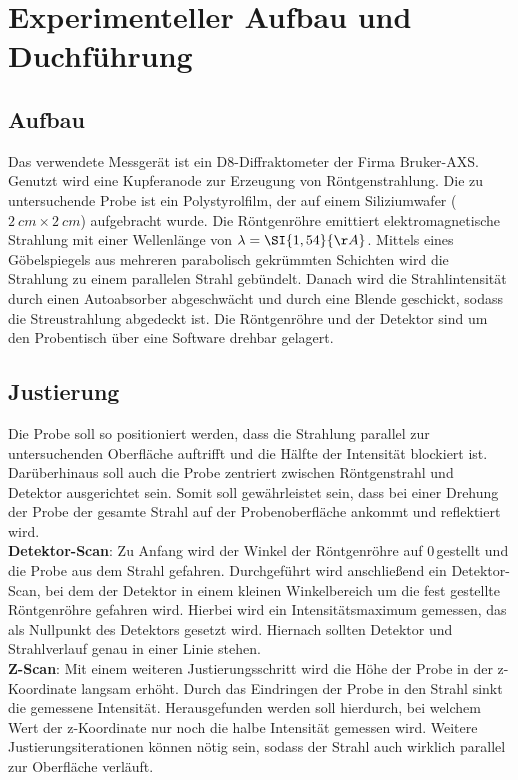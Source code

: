 \section{Experimenteller Aufbau und Duchführung}
\subsection{Aufbau}
Das verwendete Messgerät ist ein D8-Diffraktometer der Firma Bruker-AXS. Genutzt wird eine Kupferanode zur Erzeugung von Röntgenstrahlung.
Die zu untersuchende Probe ist ein Polystyrolfilm, der auf einem Siliziumwafer ($\SI{2}{cm}\times\SI{2}{cm}$) aufgebracht wurde. Die Röntgenröhre emittiert elektromagnetische Strahlung mit einer Wellenlänge von $\lambda=\SI{1,54}{\AA}$.
Mittels eines Göbelspiegels aus mehreren parabolisch gekrümmten Schichten wird die Strahlung zu einem parallelen Strahl gebündelt.
Danach wird die Strahlintensität durch einen Autoabsorber abgeschwächt und durch eine Blende geschickt, sodass die Streustrahlung abgedeckt ist. Die Röntgenröhre und der Detektor sind um den Probentisch über eine Software drehbar gelagert.
\subsection{Justierung}
Die Probe soll so positioniert werden, dass die Strahlung parallel zur untersuchenden Oberfläche auftrifft und die Hälfte der Intensität blockiert ist. Darüberhinaus soll auch die Probe zentriert zwischen Röntgenstrahl und Detektor ausgerichtet sein. Somit soll gewährleistet sein, dass bei einer Drehung der Probe der gesamte Strahl auf der Probenoberfläche ankommt und reflektiert wird.\\

\textbf{Detektor-Scan}:
Zu Anfang wird der Winkel der Röntgenröhre auf 0\textdegree\,gestellt und die Probe aus dem Strahl gefahren. Durchgeführt wird anschließend ein Detektor-Scan, bei dem der Detektor in einem kleinen Winkelbereich um die fest gestellte Röntgenröhre gefahren wird. Hierbei wird ein Intensitätsmaximum gemessen, das als Nullpunkt des Detektors gesetzt wird. Hiernach sollten Detektor und Strahlverlauf genau in einer Linie stehen.\\

\textbf{Z-Scan}:
Mit einem weiteren Justierungsschritt wird die Höhe der Probe in der z-Koordinate langsam erhöht. Durch das Eindringen der Probe in den Strahl sinkt die gemessene Intensität. Herausgefunden werden soll hierdurch, bei welchem Wert der z-Koordinate nur noch die halbe Intensität gemessen wird. Weitere Justierungsiterationen können nötig sein, sodass der Strahl auch wirklich parallel zur Oberfläche verläuft.\\


